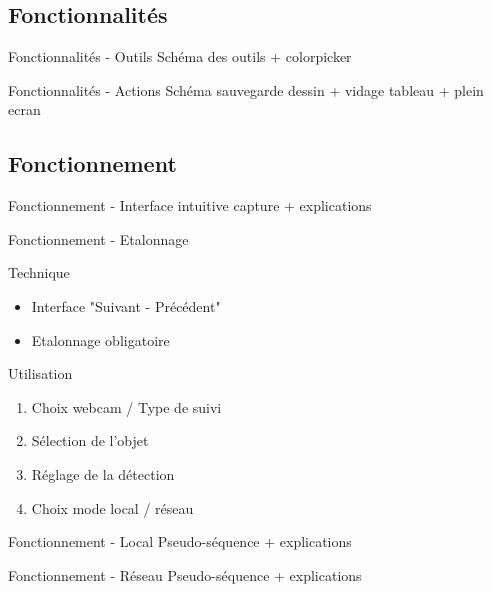 \documentclass{beamer}
\begin{document}
		\subsection{Fonctionnalités}
		\begin{frame}{Fonctionnalités - Outils}
			Schéma des outils + colorpicker
		\end{frame}
		\begin{frame}{Fonctionnalités - Actions}
			Schéma sauvegarde dessin + vidage tableau + plein ecran
		\end{frame}
		
		\subsection{Fonctionnement}
		\begin{frame}{Fonctionnement - Interface intuitive}
			capture + explications
		\end{frame}
		
		\begin{frame}{Fonctionnement - Etalonnage}
			\begin{block}{Technique}
				\begin{itemize}
					\item Interface "Suivant - Précédent"
					\item Etalonnage obligatoire
				\end{itemize}
			\end{block}
			\begin{block}{Utilisation}
				\begin{enumerate}
					\item Choix webcam / Type de suivi
					\item Sélection de l'objet
					\item Réglage de la détection
					\item Choix mode local / réseau
				\end{enumerate}
			\end{block}
			
		\end{frame}
		
		\begin{frame}{Fonctionnement - Local}
			Pseudo-séquence + explications
		\end{frame}
		
		\begin{frame}{Fonctionnement - Réseau}
			Pseudo-séquence + explications
		\end{frame}
		
\end{document}
